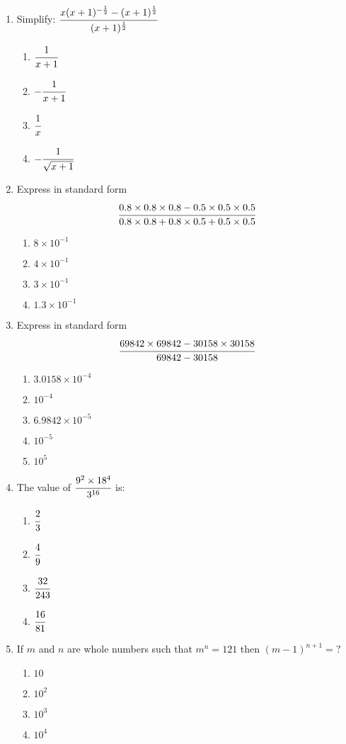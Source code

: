 \begin{multicols}{2}
\begin{enumerate}[label={\arabic*.}]
\item Simplify: $\cfrac{x(x+1)^{-\frac{1}{2}} -(x+1)^{\frac{1}{2}}}{(x+1)^{\frac{1}{2}}} $
	\begin{enumerate}[label={\Alph*.}]
	\item \(\cfrac{1}{x+1}\)
	\item \(-\cfrac{1}{x+1}\)
	\item \(\cfrac{1}{x}\)
	\item \(-\cfrac{1}{\sqrt{x+1}}\)
	\end{enumerate}
\item Express in standard form \, $$\cfrac{0.8 \times 0.8 \times 0.8 - 0.5 \times 0.5 \times 0.5}{0.8 \times 0.8 + 0.8 \times 0.5 + 0.5 \times 0.5}$$
	\begin{enumerate}[label={\Alph*.}]
	\item \(8 \times 10^{-1}\)
	\item \(4 \times 10^{-1}\)
	\item \(3 \times 10^{-1}\)
	\item \(1.3 \times 10^{-1}\)
	\end{enumerate}
\item Express in standard form $$\cfrac{69842 \times 69842 - 30158 \times 30158}{69842 - 30158}$$
	\begin{enumerate}[label={\Alph*.}]
	\item \(3.0158 \times 10^{-4}\)
	\item \(10^{-4}\)
	\item \(6.9842 \times 10^{-5}\)
	\item \(10^{-5}\)
	\item \(10^5\)
	\end{enumerate}
\item The value of $\cfrac{9^2 \times 18^4}{3^{16}}$ is:
	\begin{enumerate}[label={\Alph*.}]
	\item \(\cfrac{2}{3}\)
	\item \(\cfrac{4}{9}\)
	\item \(\cfrac{32}{243}\)
	\item \(\cfrac{16}{81}\)
	\end{enumerate}
\item If $m$ and $n$ are whole numbers such that $m^n = 121$ then $(m-1)^{n+1} = ?$
	\begin{enumerate}[label={\Alph*.}]
	\item \(10\)
	\item \(10^2\)
	\item \(10^3\)
	\item \(10^4\)

\end{enumerate}
\end{enumerate}
\end{multicols}
